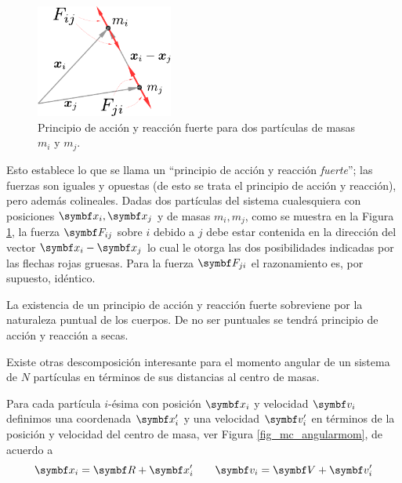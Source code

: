 \documentclass[10pt,oneside]{CBFT_book}
\begin{document}
\begin{figure}[htb]
	\begin{center}
	\includegraphics[width=0.4\textwidth]{images/fig_mc_parstrong.pdf}	
	\end{center}
	\caption{Principio de acción y reacción fuerte para dos partículas de masas $m_i$ y $m_j$.}
	\label{fig_mc_parstrong}
\end{figure} 

Esto establece lo que se llama un ``principio de acción y reacción {\it fuerte}''; las fuerzas son iguales y opuestas 
(de esto se trata el principio de acción y reacción), pero además colineales.
Dadas dos partículas del sistema cualesquiera con posiciones $ \vb{x}_i, \vb{x}_j $ y de masas $ m_i, m_j $, como se 
muestra en la Figura \ref{fig_mc_parstrong}, la fuerza $\vb{F}_{ij}$ sobre $i$ debido a $j$ debe estar contenida en la 
dirección del vector $ \vb{x}_i - \vb{x}_j $ lo cual le otorga las dos posibilidades indicadas por las flechas rojas 
gruesas. Para la fuerza $\vb{F}_{ji}$ el razonamiento es, por supuesto, idéntico.


La existencia de un principio de acción y reacción fuerte sobreviene por la naturaleza puntual de los cuerpos. De no 
ser puntuales se tendrá principio de acción y reacción a secas.

Existe otras descomposición interesante para el momento angular  de un sistema de $N$ partículas en términos de 
sus distancias al centro de masas.

Para cada partícula $i$-ésima con posición $ \vb{x}_i $ y velocidad $ \vb{v}_i $ definimos una coordenada $ \vb{x}_i' $ 
y una velocidad $\vb{v}_i' $ en términos de la posición  y velocidad  del centro de masa, ver Figura 
\ref{fig_mc_angularmom}, de acuerdo a
\[
	\vb{x}_i = \vb{R} + \vb{x}_i' \qquad \vb{v}_i = \vb{V} + \vb{v}_i'
\]
\end{document}
